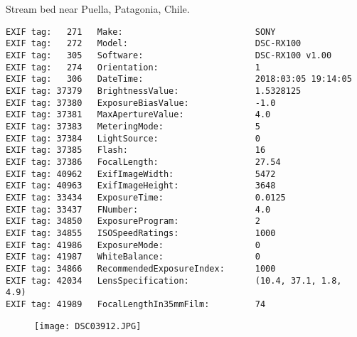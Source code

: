 \section{\protect{}}
\noindent Stream bed near Puella, Patagonia, Chile.
\noindent
\begin{lstlisting}
EXIF tag:   271   Make:                          SONY
EXIF tag:   272   Model:                         DSC-RX100
EXIF tag:   305   Software:                      DSC-RX100 v1.00
EXIF tag:   274   Orientation:                   1
EXIF tag:   306   DateTime:                      2018:03:05 19:14:05
EXIF tag: 37379   BrightnessValue:               1.5328125
EXIF tag: 37380   ExposureBiasValue:             -1.0
EXIF tag: 37381   MaxApertureValue:              4.0
EXIF tag: 37383   MeteringMode:                  5
EXIF tag: 37384   LightSource:                   0
EXIF tag: 37385   Flash:                         16
EXIF tag: 37386   FocalLength:                   27.54
EXIF tag: 40962   ExifImageWidth:                5472
EXIF tag: 40963   ExifImageHeight:               3648
EXIF tag: 33434   ExposureTime:                  0.0125
EXIF tag: 33437   FNumber:                       4.0
EXIF tag: 34850   ExposureProgram:               2
EXIF tag: 34855   ISOSpeedRatings:               1000
EXIF tag: 41986   ExposureMode:                  0
EXIF tag: 41987   WhiteBalance:                  0
EXIF tag: 34866   RecommendedExposureIndex:      1000
EXIF tag: 42034   LensSpecification:             (10.4, 37.1, 1.8, 4.9)
EXIF tag: 41989   FocalLengthIn35mmFilm:         74

\end{lstlisting}
\clearpage
\begin{figure}
\raggedleft
\texttt{[image: DSC03912.JPG]}
\end{figure}


\clearpage
